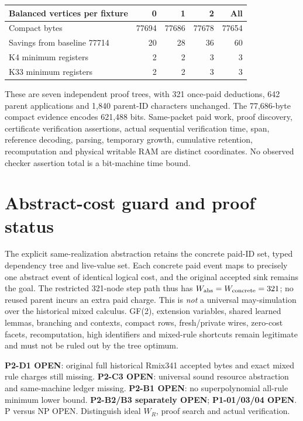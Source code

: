 \documentclass{article}
\begin{document}
\begin{center}
\begin{tabular}{lrrrr}
\toprule
Balanced vertices per fixture & 0 & 1 & 2 & All\\
\midrule
Compact bytes & 77694 & 77686 & 77678 & 77654\\
Savings from baseline 77714 & 20 & 28 & 36 & 60\\
K4 minimum registers & 2 & 2 & 3 & 3\\
K33 minimum registers & 2 & 2 & 3 & 3\\
\bottomrule
\end{tabular}
\end{center}
These are seven independent proof trees, with 321 once-paid deductions, 642 parent applications and 1,840 parent-ID characters unchanged. The 77,686-byte compact evidence encodes 621,488 bits. Same-packet paid work, proof discovery, certificate verification assertions, actual sequential verification time, span, reference decoding, parsing, temporary growth, cumulative retention, recomputation and physical writable RAM are distinct coordinates. No observed checker assertion total is a bit-machine time bound.

\section*{Abstract-cost guard and proof status}
The explicit same-realization abstraction retains the concrete paid-ID set, typed dependency tree and live-value set. Each concrete paid event maps to precisely one abstract event of identical logical cost, and the original accepted sink remains the goal. The restricted 321-node step path thus has \(W_{\rm abs}=W_{\rm concrete}=321\); no reused parent incurs an extra paid charge. This is \emph{not} a universal may-simulation over the historical mixed calculus. GF(2), extension variables, shared learned lemmas, branching and contexts, compact rows, fresh/private wires, zero-cost facets, recomputation, high identifiers and mixed-rule shortcuts remain legitimate and must not be ruled out by the tree optimum.

\textbf{P2-D1 OPEN}: original full historical Rmix341 accepted bytes and exact mixed rule charges still missing. \textbf{P2-C3 OPEN}: universal sound resource abstraction and same-machine ledger missing. \textbf{P2-B1 OPEN}: no superpolynomial all-rule minimum lower bound. \textbf{P2-B2/B3 separately OPEN}; \textbf{P1-01/03/04 OPEN}. P versus NP OPEN. Distinguish ideal \(W_R\), proof search and actual verification.
\end{document}
